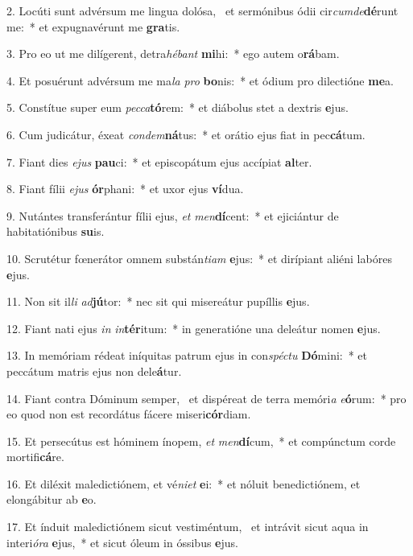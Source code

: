 2. Locúti sunt advérsum me lingua dolósa, \dag\  et sermónibus ódii cir\textit{cum}\textit{de}\textbf{dé}runt me:~*  et expugnavérunt me \textbf{gra}tis.\

3. Pro eo ut me dilígerent, detra\textit{hé}\textit{bant} \textbf{mi}hi:~*  ego autem o\textbf{rá}bam.\

4. Et posuérunt advérsum me ma\textit{la} \textit{pro} \textbf{bo}nis:~*  et ódium pro dilectióne \textbf{me}a.\

5. Constítue super eum \textit{pec}\textit{ca}\textbf{tó}rem:~*  et diábolus stet a dextris \textbf{e}jus.\

6. Cum judicátur, éxeat \textit{con}\textit{dem}\textbf{ná}tus:~*  et orátio ejus fiat in pec\textbf{cá}tum.\

7. Fiant dies \textit{e}\textit{jus} \textbf{pau}ci:~*  et episcopátum ejus accípiat \textbf{al}ter.\

8. Fiant fílii \textit{e}\textit{jus} \textbf{ór}phani:~*  et uxor ejus \textbf{ví}dua.\

9. Nutántes transferántur fílii ejus, \textit{et} \textit{men}\textbf{dí}cent:~*  et ejiciántur de habitatiónibus \textbf{su}is.\

10. Scrutétur fœnerátor omnem substán\textit{ti}\textit{am} \textbf{e}jus:~*  et dirípiant aliéni labóres \textbf{e}jus.\

11. Non sit il\textit{li} \textit{ad}\textbf{jú}tor:~*  nec sit qui misereátur pupíllis \textbf{e}jus.\

12. Fiant nati ejus \textit{in} \textit{in}\textbf{tér}itum:~*  in generatióne una deleátur nomen \textbf{e}jus.\

13. In memóriam rédeat iníquitas patrum ejus in con\textit{spéc}\textit{tu} \textbf{Dó}mini:~*  et peccátum matris ejus non dele\textbf{á}tur.\

14. Fiant contra Dóminum semper, \dag\  et dispéreat de terra memóri\textit{a} \textit{e}\textbf{ó}rum:~*  pro eo quod non est recordátus fácere miseri\textbf{cór}diam.\

15. Et persecútus est hóminem ínopem, \textit{et} \textit{men}\textbf{dí}cum,~*  et compúnctum corde mortifi\textbf{cá}re.\

16. Et diléxit maledictiónem, et vé\textit{ni}\textit{et} \textbf{e}i:~*  et nóluit benedictiónem, et elongábitur ab \textbf{e}o.\

17. Et índuit maledictiónem sicut vestiméntum, \dag\  et intrávit sicut aqua in interi\textit{ó}\textit{ra} \textbf{e}jus,~*  et sicut óleum in óssibus \textbf{e}jus.\

